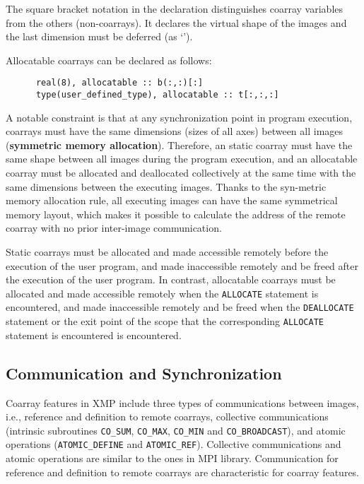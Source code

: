 The square bracket notation in the declaration distinguishes coarray variables from 
the others (non-coarrays). It declares the virtual shape of the images and the last 
dimension must be deferred (as `{\tt *}').

Allocatable coarrays can be declared as follows:
\begin{verbatim}
      real(8), allocatable :: b(:,:)[:]
      type(user_defined_type), allocatable :: t[:,:,:]
\end{verbatim}


A notable constraint is that at any synchronization point in program execution, 
coarrays must have the same dimensions (sizes of all axes) between all images
({\bf symmetric memory allocation}). 
Therefore, an static coarray must have the same shape between all images during 
the program execution, and an allocatable coarray must be allocated and deallocated 
collectively at the same time with the same dimensions between the executing images.
Thanks to the syn-metric memory allocation rule, all executing images can have
the same symmetrical memory layout, which makes it possible to calculate the address 
of the remote coarray with no prior inter-image communication.

\requirement
Static coarrays must be allocated and made accessible remotely
before the execution of the user program, and 
made inaccessible remotely and be freed after the execution of the user program.
In contrast, 
allocatable coarrays must be allocated and made accessible remotely
when the {\tt ALLOCATE} statement is encountered, and 
made inaccessible remotely and be freed when the {\tt DEALLOCATE} statement or 
the exit point of the scope that the corresponding {\tt ALLOCATE} statement is encountered 
is encountered.


\subsection{Communication and Synchronization}\label{sec:spec-comm}

Coarray features in XMP include three types of communications between images, i.e.,
reference and definition to remote coarrays,
collective communications (intrinsic subroutines {\tt CO\_SUM}, {\tt CO\_MAX}, 
{\tt CO\_MIN} and {\tt CO\_BROADCAST}), and
atomic operations ({\tt ATOMIC\_DEFINE} and {\tt ATOMIC\_REF}).
%
Collective communications and atomic operations are similar to the ones 
in MPI library.
Communication for reference and definition to remote coarrays are 
characteristic for coarray features.


